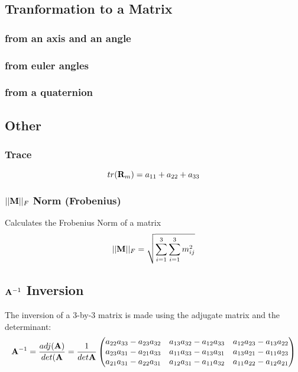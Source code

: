 \subsection{Tranformation to a Matrix}
\subsubsection*{from an axis and an angle}


\subsubsection*{from euler angles}


\subsubsection*{from a quaternion}




\subsection{Other}
\subsubsection*{Trace}
\begin{equation}
tr(\mat{R}_m) = a_{11} + a_{22} + a_{33}
\end{equation}

\subsubsection*{$\norm{\norm{\mat M}}_F$ Norm (Frobenius)}
Calculates the Frobenius Norm of a matrix
\begin{equation}
\norm{\norm{\mat M}}_F = \sqrt{\sum_{i=1}^3 \sum_{i=1}^3 m_{ij}^2 }
\end{equation}

\subsection*{$\inv{\mat A} $ Inversion}
The inversion of a 3-by-3 matrix is made using the adjugate matrix and the determinant:
\begin{equation}
\inv{\mat A} = \frac{adj(\mat A)}{det(\mat A} = \frac{1}{det{\mat A}} \begin{pmatrix}
a_{22}a_{33}-a_{23}a_{32}&a_{13}a_{32}-a_{12}a_{33}&a_{12}a_{23}-a_{13}a_{22}\\
a_{23}a_{31}-a_{21}a_{33}&a_{11}a_{33}-a_{13}a_{31}&a_{13}a_{21}-a_{11}a_{23}\\
a_{21}a_{31}-a_{22}a_{31}&a_{12}a_{31}-a_{11}a_{32}&a_{11}a_{22}-a_{12}a_{21}
\end{pmatrix}
\end{equation}
